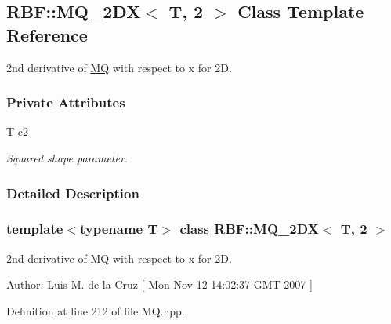 \hypertarget{classRBF_1_1MQ__2DX_3_01T_00_012_01_4}{
\subsection{RBF::MQ\_\-2DX$<$ T, 2 $>$ Class Template Reference}
\label{classRBF_1_1MQ__2DX_3_01T_00_012_01_4}
}
2nd derivative of \hyperlink{classRBF_1_1MQ}{MQ} with respect to x for 2D.  


\subsubsection*{Private Attributes}
\begin{CompactItemize}
\item 
\hypertarget{classRBF_1_1MQ__2DX_3_01T_00_012_01_4_2ad0e884a0259c56a40e1d0617a12042}{
T \hyperlink{classRBF_1_1MQ__2DX_3_01T_00_012_01_4_2ad0e884a0259c56a40e1d0617a12042}{c2}}
\label{classRBF_1_1MQ__2DX_3_01T_00_012_01_4_2ad0e884a0259c56a40e1d0617a12042}

\begin{CompactList}\small\item\em Squared shape parameter. \item\end{CompactList}\end{CompactItemize}


\subsubsection{Detailed Description}
\subsubsection*{template$<$typename T$>$ class RBF::MQ\_\-2DX$<$ T, 2 $>$}

2nd derivative of \hyperlink{classRBF_1_1MQ}{MQ} with respect to x for 2D. 

\begin{Desc}
\item[Author:]Luis M. de la Cruz \mbox{[} Mon Nov 12 14:02:37 GMT 2007 \mbox{]} \end{Desc}


Definition at line 212 of file MQ.hpp.